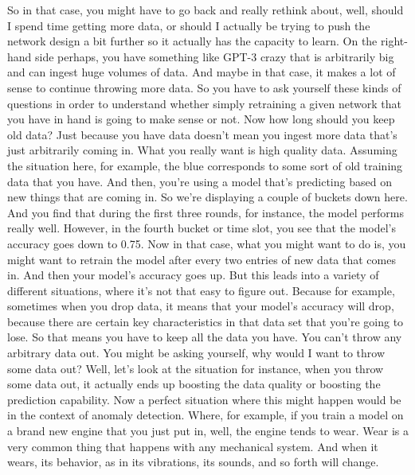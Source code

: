 {{{{{{{{     So in that case, you might have to go back and really rethink about, well,
     should I spend time getting more data, or should I actually
     be trying to push the network design a bit further so it actually
     has the capacity to learn.
     On the right-hand side perhaps, you have something
     like GPT-3 crazy that is arbitrarily big and can ingest huge volumes of data.
     And maybe in that case, it makes a lot of sense
     to continue throwing more data.
     So you have to ask yourself these kinds of questions in order
     to understand whether simply retraining a given network that you have
     in hand is going to make sense or not.
     Now how long should you keep old data?
     Just because you have data doesn't mean you ingest more data that's
     just arbitrarily coming in.
     What you really want is high quality data.
     Assuming the situation here, for example,
     the blue corresponds to some sort of old training data that you have.
     And then, you're using a model that's predicting
     based on new things that are coming in.
     So we're displaying a couple of buckets down here.
     And you find that during the first three rounds,
     for instance, the model performs really well.
     However, in the fourth bucket or time slot,
     you see that the model's accuracy goes down to 0.75.
     Now in that case, what you might want to do
     is, you might want to retrain the model after every two entries of new data
     that comes in.
     And then your model's accuracy goes up.
     But this leads into a variety of different situations,
     where it's not that easy to figure out.
     Because for example, sometimes when you drop data,
     it means that your model's accuracy will drop,
     because there are certain key characteristics in that data
     set that you're going to lose.
     So that means you have to keep all the data you have.
     You can't throw any arbitrary data out.
     You might be asking yourself, why would I want to throw some data out?
     Well, let's look at the situation for instance, when you throw some data out,
     it actually ends up boosting the data quality
     or boosting the prediction capability.
     Now a perfect situation where this might happen
     would be in the context of anomaly detection.
     Where, for example, if you train a model on a brand new engine
     that you just put in, well, the engine tends to wear.
     Wear is a very common thing that happens with any mechanical system.
     And when it wears, its behavior, as in its vibrations,
     its sounds, and so forth will change.
}}}}}}}}
